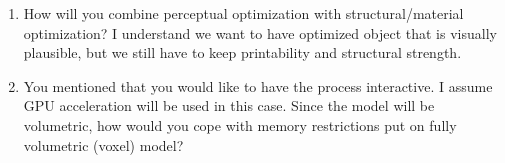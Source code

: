 \begin{enumerate}
	\item How will you combine perceptual optimization with structural/material optimization? I understand we want to have optimized object that is visually plausible, but we still have to keep printability and structural strength.
	
	\item You mentioned that you would like to have the process interactive. I assume GPU acceleration will be used in this case. Since the model will be volumetric, how would you cope with memory restrictions put on fully volumetric (voxel) model?
	
\end{enumerate}